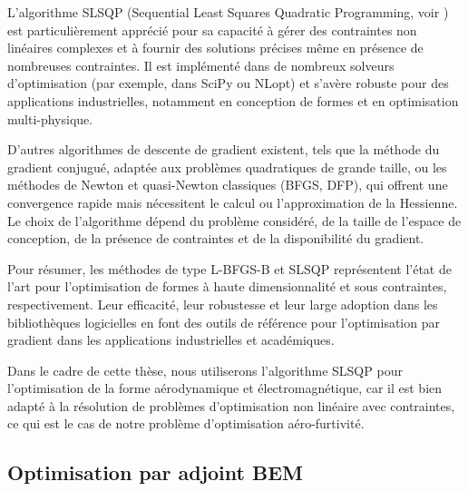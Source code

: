 L'algorithme SLSQP (Sequential Least Squares Quadratic Programming, voir \cite{Kraft1988}) est particulièrement apprécié pour sa capacité à gérer des contraintes non linéaires complexes et à fournir des solutions précises même en présence de nombreuses contraintes. Il est implémenté dans de nombreux solveurs d'optimisation (par exemple, dans SciPy ou NLopt) et s'avère robuste pour des applications industrielles, notamment en conception de formes et en optimisation multi-physique.

D'autres algorithmes de descente de gradient existent, tels que la méthode du gradient conjugué, adaptée aux problèmes quadratiques de grande taille, ou les méthodes de Newton et quasi-Newton classiques (BFGS, DFP), qui offrent une convergence rapide mais nécessitent le calcul ou l'approximation de la Hessienne. Le choix de l'algorithme dépend du problème considéré, de la taille de l'espace de conception, de la présence de contraintes et de la disponibilité du gradient.

Pour résumer, les méthodes de type L-BFGS-B et SLSQP représentent l'état de l'art pour l'optimisation de formes à haute dimensionnalité et sous contraintes, respectivement. Leur efficacité, leur robustesse et leur large adoption dans les bibliothèques logicielles en font des outils de référence pour l'optimisation par gradient dans les applications industrielles et académiques.

Dans le cadre de cette thèse, nous utiliserons l'algorithme SLSQP pour l'optimisation de la forme aérodynamique et électromagnétique, car il est bien adapté à la résolution de problèmes d'optimisation non linéaire avec  contraintes, ce qui est le cas de notre problème d'optimisation aéro-furtivité.

\subsection{Optimisation par adjoint BEM}

